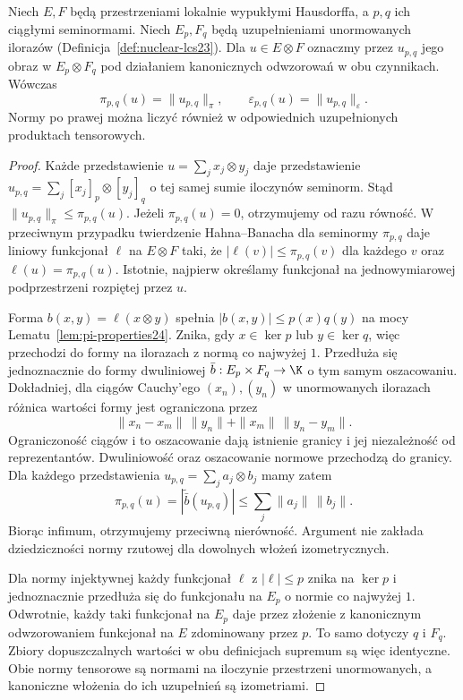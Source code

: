 \begin{lemat}
\label{lem:tensor-seminorm-completions24}
Niech $E,F$ będą przestrzeniami lokalnie wypukłymi
Hausdorffa, a $p,q$ ich ciągłymi seminormami.
Niech $E_p,F_q$ będą uzupełnieniami unormowanych
ilorazów (Definicja~\ref{def:nuclear-lcs23}).
Dla $u\in E\otimes F$ oznaczmy przez $u_{p,q}$
jego obraz w $E_p\otimes F_q$ pod działaniem
kanonicznych odwzorowań w obu czynnikach. Wówczas
\[
 \pi_{p,q}(u)=\|u_{p,q}\|_\pi,\qquad
 \varepsilon_{p,q}(u)=\|u_{p,q}\|_\varepsilon.
\]
Normy po prawej można liczyć również w odpowiednich
uzupełnionych produktach tensorowych.
\end{lemat}
\begin{proof}
Każde przedstawienie $u=\sum_jx_j\otimes y_j$
daje przedstawienie $u_{p,q}=\sum_j[x_j]_p\otimes[y_j]_q$
o tej samej sumie iloczynów seminorm. Stąd
$\|u_{p,q}\|_\pi\le\pi_{p,q}(u)$.
Jeżeli $\pi_{p,q}(u)=0$, otrzymujemy od razu równość.
W przeciwnym przypadku twierdzenie Hahna--Banacha
dla seminormy $\pi_{p,q}$ daje liniowy funkcjonał
$\ell$ na $E\otimes F$ taki, że
$|\ell(v)|\le\pi_{p,q}(v)$ dla każdego $v$
oraz $\ell(u)=\pi_{p,q}(u)$.
Istotnie, najpierw określamy funkcjonał na
jednowymiarowej podprzestrzeni rozpiętej przez $u$.

Forma $b(x,y)=\ell(x\otimes y)$ spełnia
$|b(x,y)|\le p(x)q(y)$ na mocy
Lematu~\ref{lem:pi-properties24}. Znika, gdy
$x\in\ker p$ lub $y\in\ker q$, więc przechodzi
do formy na ilorazach z normą co najwyżej $1$.
Przedłuża się jednoznacznie do formy dwuliniowej
$\bar b:E_p\times F_q\to\K$ o tym samym oszacowaniu.
Dokładniej, dla ciągów Cauchy'ego $(x_n),(y_n)$
w unormowanych ilorazach różnica wartości formy
jest ograniczona przez
\[
 \|x_n-x_m\|\,\|y_n\|+\|x_m\|\,\|y_n-y_m\|.
\]
Ograniczoność ciągów i to oszacowanie dają istnienie
granicy i jej niezależność od reprezentantów.
Dwuliniowość oraz oszacowanie normowe przechodzą
do granicy. Dla każdego przedstawienia
$u_{p,q}=\sum_j a_j\otimes b_j$ mamy zatem
\[
 \pi_{p,q}(u)=|\widetilde{\bar b}(u_{p,q})|
 \le\sum_j\|a_j\|\,\|b_j\|.
\]
Biorąc infimum, otrzymujemy przeciwną nierówność.
Argument nie zakłada dziedziczności normy rzutowej
dla dowolnych włożeń izometrycznych.

Dla normy injektywnej każdy funkcjonał $\ell$
z $|\ell|\le p$ znika na $\ker p$ i jednoznacznie
przedłuża się do funkcjonału na $E_p$ o normie
co najwyżej $1$. Odwrotnie, każdy taki funkcjonał
na $E_p$ daje przez złożenie z kanonicznym
odwzorowaniem funkcjonał na $E$ zdominowany przez $p$.
To samo dotyczy $q$ i $F_q$. Zbiory dopuszczalnych
wartości w obu definicjach supremum są więc identyczne.
Obie normy tensorowe są normami na iloczynie
przestrzeni unormowanych, a kanoniczne włożenia do
ich uzupełnień są izometriami.
\end{proof}

